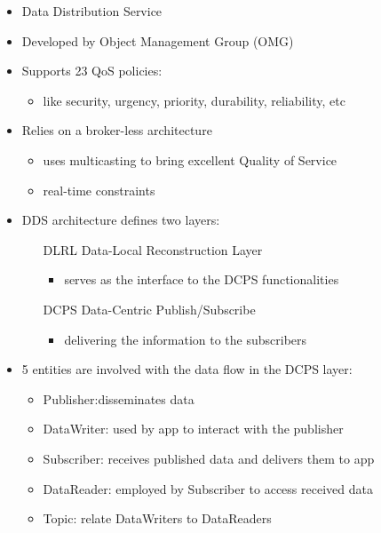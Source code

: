 \begin{itemize}
	\item Data Distribution Service
	\item Developed by Object Management Group (OMG)
	\item Supports 23 QoS policies:
		\begin{itemize}
			\item like security, urgency, priority, durability, reliability, etc
		\end{itemize}
	\item Relies on a broker-less architecture
		\begin{itemize}
			\item uses multicasting to bring excellent Quality of Service
			\item real-time constraints
		\end{itemize}
	\item DDS architecture defines two layers:
		\begin{itemize}
			\item[DLRL] Data-Local Reconstruction Layer
				\begin{itemize}
					\item serves as the interface to the DCPS functionalities
				\end{itemize}
			\item[DCPS] Data-Centric Publish/Subscribe
				\begin{itemize}
					\item delivering the information to the subscribers
				\end{itemize}
			\end{itemize}
		\item 5 entities are involved with the data flow in the DCPS layer:
			\begin{itemize}
				\item Publisher:disseminates data
				\item DataWriter: used by app to interact with the publisher
				\item Subscriber: receives published data and delivers them to app
				\item DataReader: employed by Subscriber to access received data
				\item Topic: relate DataWriters to DataReaders
			\end{itemize}
		\end{itemize}

